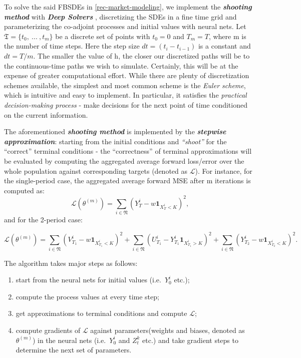 \documentclass[a4paper,10pt]{article}
\newcommand{\1}{\mathbf{1}}
\begin{document}
To solve the said FBSDEs in \ref{rec-market-modeling}, we
implement the \textbf{\emph{shooting method}} with \emph{\textbf{Deep Solvers}}
\cite{JH}, discretizing the SDEs in a fine time grid and parameterizing the
co-adjoint processes and initial values with neural nets. Let
\(\mathfrak{T}=\lbrace{t_0,~...~, t_m \rbrace}\) be a discrete set of
points with \(t_0=0\) and \(T_m=T\), where m is the number of time
steps. Here the step size \(dt=(t_i-t_{i-1})\) is a constant and
\(dt=T/m\). The smaller the value of h, the closer our discretized paths
will be to the continuous-time paths we wish to simulate. Certainly,
this will be at the expense of greater computational effort. While there
are plenty of discretization schemes available, the simplest and most
common scheme is the \emph{Euler scheme}, which is intuitive and easy to
implement. In particular, it satisfies the \emph{practical
decision-making process} - make decisions for the next point of time
conditioned on the current information.

The aforementioned \textbf{\emph{shooting method}} is implemented by the
\textbf{\textit{stepwise approximation}}: starting from the initial conditions and
\emph{``shoot''} for the ``correct'' terminal conditions - the
``correctness'' of terminal approximations will be evaluated by
computing the aggregated average forward loss/error over the whole
population against corresponding targets (denoted as \(\mathcal{L}\)).
For instance, for the single-period case, the aggregated average forward
MSE after m iterations is computed as: \[
\mathcal{L}(\theta^{(m)})= \sum_{i\in\mathfrak{N}}(Y_{T}^i-w\mathbf{1}_{X_{T}^i<K})^2,
\] and for the 2-period case:

\[
\mathcal{L}(\theta^{(m)})= \sum_{i\in\mathfrak{N}}(V_{T_1}^i-w\mathbf{1}_{X_{T_1}^i<K})^2 + \sum_{i\in\mathfrak{N}}(U_{T_1}^i-Y_{T_1}^i\mathbf{1}_{X_{T_1}^i>K})^2 + \sum_{i\in\mathfrak{N}}(Y_{T_2}^i-w\mathbf{1}_{X_{T_2}^i<K})^2.
\]

The algorithm takes major steps as follows:

\begin{enumerate}
    \item
      start from the neural nets for initial values (i.e.~\(Y_0^i\) etc.);
    \item
      compute the process values at every time step;
    \item
      get approximations to terminal conditions and compute \(\mathcal{L}\);
    \item
      compute gradients of \(\mathcal{L}\) against parameters(weights and
      biases, denoted as \(\theta^{(m)}\)) in the neural nets
      (i.e.~\(Y_0^i\) and \(Z_t^k\) etc.) and take gradient steps to
      determine the next set of parameters.
\end{enumerate}
\end{document}
